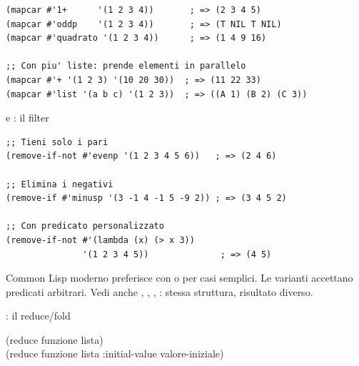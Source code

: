 \begin{esempio}[\fn{mapcar}]
\begin{lstlisting}
(mapcar #'1+      '(1 2 3 4))       ; => (2 3 4 5)
(mapcar #'oddp    '(1 2 3 4))       ; => (T NIL T NIL)
(mapcar #'quadrato '(1 2 3 4))      ; => (1 4 9 16)

;; Con piu' liste: prende elementi in parallelo
(mapcar #'+ '(1 2 3) '(10 20 30))  ; => (11 22 33)
(mapcar #'list '(a b c) '(1 2 3))  ; => ((A 1) (B 2) (C 3))
\end{lstlisting}
\end{esempio}

\seprule

\begin{concetto}{ e : il filter}

\boxsep
{}
\end{concetto}

\begin{esempio}
\begin{lstlisting}
;; Tieni solo i pari
(remove-if-not #'evenp '(1 2 3 4 5 6))   ; => (2 4 6)

;; Elimina i negativi
(remove-if #'minusp '(3 -1 4 -1 5 -9 2)) ; => (3 4 5 2)

;; Con predicato personalizzato
(remove-if-not #'(lambda (x) (> x 3))
               '(1 2 3 4 5))              ; => (4 5)
\end{lstlisting}
\end{esempio}

\begin{nota}
Common Lisp moderno preferisce  con  o
 per casi semplici. Le varianti  accettano
predicati arbitrari. Vedi anche , ,
, : stessa struttura, risultato diverso.
\end{nota}

\seprule

\begin{concetto}{: il reduce/fold}

\begin{sintassi}
(reduce funzione lista)\\
(reduce funzione lista :initial-value valore-iniziale)
\end{sintassi}

\end{concetto}

